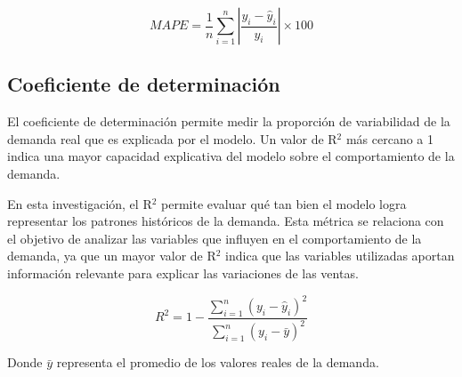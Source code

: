 \begin{equation}
MAPE = \frac{1}{n}\sum_{i=1}^{n}\left|\frac{y_i-\hat{y}_i}{y_i}\right|\times 100
\end{equation}

\subsection{Coeficiente de determinación}

El coeficiente de determinación permite medir la proporción de variabilidad de la demanda real que es explicada por el modelo. Un valor de R$^2$ más cercano a 1 indica una mayor capacidad explicativa del modelo sobre el comportamiento de la demanda.

En esta investigación, el R$^2$ permite evaluar qué tan bien el modelo logra representar los patrones históricos de la demanda. Esta métrica se relaciona con el objetivo de analizar las variables que influyen en el comportamiento de la demanda, ya que un mayor valor de R$^2$ indica que las variables utilizadas aportan información relevante para explicar las variaciones de las ventas.

\begin{equation}
R^2 = 1-\frac{\sum_{i=1}^{n}(y_i-\hat{y}_i)^2}{\sum_{i=1}^{n}(y_i-\bar{y})^2}
\end{equation}

Donde $\bar{y}$ representa el promedio de los valores reales de la demanda.


		
		
		
